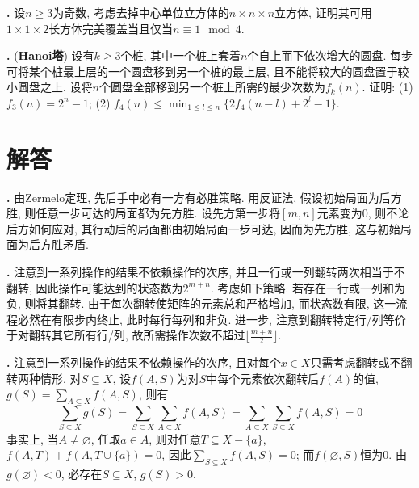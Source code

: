 \par \textbf{\theprobrec .} \cite{IC} 设$n\ge 3$为奇数, 考虑去掉中心单位立方体的$n\times n\times n$立方体, 证明其可用$1\times 1\times 2$长方体完美覆盖当且仅当$n\equiv 1 \mod 4$. 

\par \textbf{\theprobrec .} (\textbf{Hanoi塔}) 设有$k\ge 3$个桩, 其中一个桩上套着$n$个自上而下依次增大的圆盘. 每步可将某个桩最上层的一个圆盘移到另一个桩的最上层, 且不能将较大的圆盘置于较小圆盘之上. 设将$n$个圆盘全部移到另一个桩上所需的最少次数为$f_k(n)$. 证明: (1) $f_3(n)=2^n-1$; (2) $f_4(n)\le \min_{1\le l\le n}\{2f_4(n-l)+2^{l}-1\}$.

\section*{解答}

\par \textbf{\thesolrec .} \cite{MaP} 由Zermelo定理, 先后手中必有一方有必胜策略. 用反证法, 假设初始局面为后方胜, 则任意一步可达的局面都为先方胜. 设先方第一步将$[m,n]$元素变为0, 则不论后方如何应对, 其行动后的局面都由初始局面一步可达, 因而为先方胜, 这与初始局面为后方胜矛盾. 

\par \textbf{\thesolrec .} \cite{MaP} 注意到一系列操作的结果不依赖操作的次序, 并且一行或一列翻转两次相当于不翻转, 因此操作可能达到的状态数为$2^{m+n}$. 考虑如下策略: 若存在一行或一列和为负, 则将其翻转. 由于每次翻转使矩阵的元素总和严格增加, 而状态数有限, 这一流程必然在有限步内终止, 此时每行每列和非负. 进一步, 注意到翻转特定行/列等价于对翻转其它所有行/列, 故所需操作次数不超过$\lfloor \frac{m+n}{2}\rfloor$. 

\par \textbf{\thesolrec .} \cite{MaP} 注意到一系列操作的结果不依赖操作的次序, 且对每个$x\in X$只需考虑翻转或不翻转两种情形. 对$S\subseteq X$, 设$f(A,S)$为对$S$中每个元素依次翻转后$f(A)$的值, $g(S)=\sum_{A\subseteq X} f(A,S)$, 则有
\begin{equation}
    \sum_{S\subseteq X} g(S)=\sum_{S\subseteq X}\sum_{A\subseteq X} f(A,S)=\sum_{A\subseteq X} \sum_{S\subseteq X} f(A,S)=0
\end{equation}
事实上, 当$A\neq \varnothing$, 任取$a\in A$, 则对任意$T\subseteq X-\{a\}$, $f(A,T)+f(A,T\cup \{a\})=0$, 因此$\sum_{S\subseteq X} f(A,S)=0$; 而$f(\varnothing, S)$恒为0. 由$g(\varnothing)<0$, 必存在$S\subseteq X$, $g(S)>0$. 

